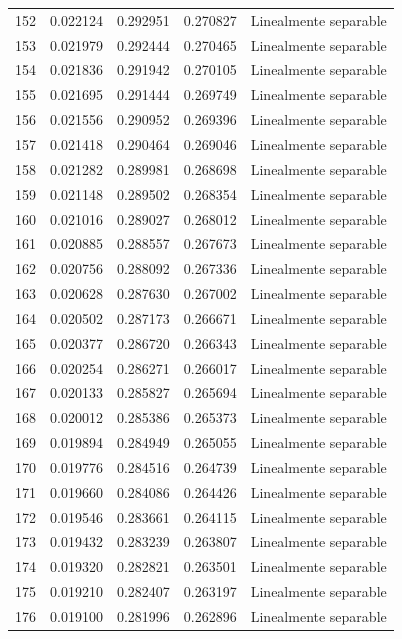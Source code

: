 \begin{tabular}{lllll}
152 & 0.022124 & 0.292951 & 0.270827 & Linealmente separable \\
153 & 0.021979 & 0.292444 & 0.270465 & Linealmente separable \\
154 & 0.021836 & 0.291942 & 0.270105 & Linealmente separable \\
155 & 0.021695 & 0.291444 & 0.269749 & Linealmente separable \\
156 & 0.021556 & 0.290952 & 0.269396 & Linealmente separable \\
157 & 0.021418 & 0.290464 & 0.269046 & Linealmente separable \\
158 & 0.021282 & 0.289981 & 0.268698 & Linealmente separable \\
159 & 0.021148 & 0.289502 & 0.268354 & Linealmente separable \\
160 & 0.021016 & 0.289027 & 0.268012 & Linealmente separable \\
161 & 0.020885 & 0.288557 & 0.267673 & Linealmente separable \\
162 & 0.020756 & 0.288092 & 0.267336 & Linealmente separable \\
163 & 0.020628 & 0.287630 & 0.267002 & Linealmente separable \\
164 & 0.020502 & 0.287173 & 0.266671 & Linealmente separable \\
165 & 0.020377 & 0.286720 & 0.266343 & Linealmente separable \\
166 & 0.020254 & 0.286271 & 0.266017 & Linealmente separable \\
167 & 0.020133 & 0.285827 & 0.265694 & Linealmente separable \\
168 & 0.020012 & 0.285386 & 0.265373 & Linealmente separable \\
169 & 0.019894 & 0.284949 & 0.265055 & Linealmente separable \\
170 & 0.019776 & 0.284516 & 0.264739 & Linealmente separable \\
171 & 0.019660 & 0.284086 & 0.264426 & Linealmente separable \\
172 & 0.019546 & 0.283661 & 0.264115 & Linealmente separable \\
173 & 0.019432 & 0.283239 & 0.263807 & Linealmente separable \\
174 & 0.019320 & 0.282821 & 0.263501 & Linealmente separable \\
175 & 0.019210 & 0.282407 & 0.263197 & Linealmente separable \\
176 & 0.019100 & 0.281996 & 0.262896 & Linealmente separable \\

\end{tabular}
